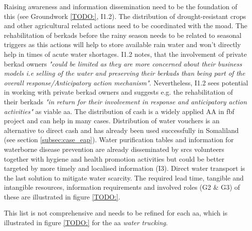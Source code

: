 Raising awareness and information dissemination need to be the foundation of this (see Groundwork \ref*{TODO:}, I1.2). The distribution of drought-resistant crops and other agricultural related actions need to be coordinated with the \acrfull{moad}. The rehabilitation of berkads before the rainy season needs to be related to seasonal triggers as this actions will help to store available rain water and won't directly help in times of acute water shortages. I1.2 notes, that the involvement of private berkad owners \textit{"could be limited as they are more concerned about their business models i.e selling of the water and preserving their berkads than being part of the overall response/Anticipatory action mechanism"}. Nevertheless, I1.2 sees potential in working with private berkad owners and suggests e.g. the rehabilitation of their berkads \textit{"in return for their involvement in response and anticipatory action activities"} as viable \acrshort{aa}. The distribution of cash is a widely applied AA in \acrshort{fbf} project and can help in many cases. Distribution of water vouchers is an alternative to direct cash and has already been used successfully in Somaliland (see section \ref*{subsec:case_eap}). Water purification tables and information for waterborne disease prevention are already disseminated by \acrshort{srcs} volunteers together with hygiene and health promotion activities but could be better targeted by more timely and localised information (I3). Direct water transport is the last solution to mitigate water scarcity. The required lead time, tangible and intangible resources, information requirements and involved roles (G2 \& G3) of these  are illustrated in figure \ref*{TODO:}. 


This list is not comprehensive and needs to be refined for each \acrshort{aa}, which is illustrated in figure \ref*{TODO:} for the \acrshort{aa} \textit{water trucking}.


